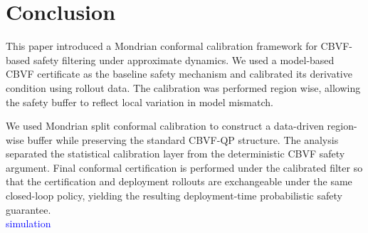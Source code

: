 \documentclass[letterpaper,10pt,conference]{ieeeconf}
\begin{document}
\section{Conclusion}

This paper introduced a Mondrian conformal calibration framework for
CBVF-based safety filtering under approximate dynamics. We used a model-based
CBVF certificate as the baseline safety mechanism and calibrated its
derivative condition using rollout data. The calibration was performed region
wise, allowing the safety buffer to reflect local variation in model mismatch.

We used Mondrian split conformal calibration to construct a data-driven
region-wise buffer while preserving the standard CBVF-QP structure. The analysis separated the statistical calibration layer from the deterministic
CBVF safety argument. Final conformal certification is performed under the
calibrated filter so that the certification and deployment rollouts are
exchangeable under the same closed-loop policy, yielding the resulting
deployment-time probabilistic safety guarantee. \\\textcolor{blue}{simulation}



\end{document}
